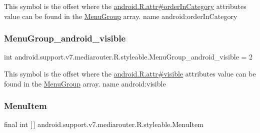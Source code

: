 This symbol is the offset where the \hyperlink{}{android.\+R.\+attr\#order\+In\+Category} attribute\textquotesingle{}s value can be found in the \hyperlink{classandroid_1_1support_1_1v7_1_1mediarouter_1_1R_1_1styleable_a0bae5cf4aace765b3bb99d32de6ce7ff}{Menu\+Group} array.  name android\+:order\+In\+Category \mbox{\label{classandroid_1_1support_1_1v7_1_1mediarouter_1_1R_1_1styleable_a3105b99a4ceb4bd3bba44b5de600fc44}} 
\subsubsection{\texorpdfstring{Menu\+Group\+\_\+android\+\_\+visible}{MenuGroup\_android\_visible}}
{\footnotesize\ttfamily int android.\+support.\+v7.\+mediarouter.\+R.\+styleable.\+Menu\+Group\+\_\+android\+\_\+visible = 2\hspace{0.3cm}{\ttfamily [static]}}

This symbol is the offset where the \hyperlink{}{android.\+R.\+attr\#visible} attribute\textquotesingle{}s value can be found in the \hyperlink{classandroid_1_1support_1_1v7_1_1mediarouter_1_1R_1_1styleable_a0bae5cf4aace765b3bb99d32de6ce7ff}{Menu\+Group} array.  name android\+:visible \mbox{\label{classandroid_1_1support_1_1v7_1_1mediarouter_1_1R_1_1styleable_ab3f2d4af0d17a47efacf7fd82df9528d}} 
\subsubsection{\texorpdfstring{Menu\+Item}{MenuItem}}
{\footnotesize\ttfamily final int \mbox{[}$\,$\mbox{]} android.\+support.\+v7.\+mediarouter.\+R.\+styleable.\+Menu\+Item\hspace{0.3cm}{\ttfamily [static]}}

